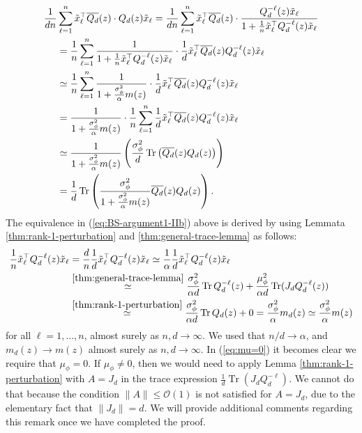 \documentclass{article}
\begin{document}
 \begin{align}
\frac{1}{dn}&\sum_{\ell=1}^n \tilde{x}_\ell^\top\overline{Q_{d}}(z)\cdot Q_{d}(z)\tilde{x}_\ell = \frac{1}{dn}\sum_{\ell=1}^n \tilde{x}_\ell^\top\overline{Q_{d}}(z)\cdot \frac{Q_{d}^{-\ell}(z)\tilde{x}_\ell}{1+\frac{1}{n}\tilde{x}_\ell^\top Q_{d}^{-\ell}(z)\tilde{x}_\ell} \notag
\\ &= \frac{1}{n}\sum_{\ell=1}^n\frac{1}{1+\frac{1}{n}\tilde{x}_\ell^\top Q_{d}^{-\ell}(z)\tilde{x}_\ell}\cdot\frac{1}{d}\tilde{x}_\ell^\top\overline{Q_{d}}(z)Q_{d}^{-\ell}(z)\tilde{x}_\ell \notag
\\ &\simeq \frac{1}{n}\sum_{\ell=1}^n\frac{1}{1+\frac{\sigma_\phi^2}{\alpha}m(z)}\cdot\frac{1}{d}\tilde{x}_\ell^\top\overline{Q_{d}}(z)Q_{d}^{-\ell}(z)\tilde{x}_\ell \label{eq:BS-argument1-IIb}
\\ &= \frac{1}{1+\frac{\sigma_\phi^2}{\alpha}m(z)}\cdot\frac{1}{n}\sum_{\ell=1}^n\frac{1}{d}\tilde{x}_\ell^\top\overline{Q_{d}}(z)Q_{d}^{-\ell}(z)\tilde{x}_\ell \notag
\\ &\simeq \frac{1}{1+\frac{\sigma_\phi^2}{\alpha}m(z)}\left(\frac{\sigma_\phi^2}{d}\operatorname{Tr}\left(\overline{Q_{d}}(z)Q_{d}(z)\right)\right) \label{eq:BS-argement2-IIb}
\\ &= \frac{1}{d}\operatorname{Tr}\left(\frac{\sigma_\phi^2}{1+\frac{\sigma_\phi^2}{\alpha}m(z)}\overline{Q_{d}}(z)Q_{d}(z)\right). \notag
\end{align}
The equivalence in (\ref{eq:BS-argument1-IIb}) above is derived by using Lemmata \ref{thm:rank-1-perturbation} and \ref{thm:general-trace-lemma} as follows:
\begin{align}
\frac{1}{n}\tilde{x}_\ell^\top Q_{d}^{-\ell}(z)\tilde{x}_\ell &= \frac{d}{n}\frac{1}{d}\tilde{x}_\ell^\top Q_{d}^{-\ell}(z)\tilde{x}_\ell \simeq \frac{1}{\alpha}\frac{1}{d}\tilde{x}_\ell^\top Q_{d}^{-\ell}(z)\tilde{x}_\ell \notag
\\ &\stackrel{\ref{thm:general-trace-lemma}}{\simeq} \frac{\sigma_\phi^2}{\alpha d}\operatorname{Tr}Q_{d}^{-\ell}(z) + \frac{\mu_\phi^2}{\alpha d}\operatorname{Tr}(J_{d}Q_{d}^{-\ell}(z)) \label{eq:mu=0}
\\ &\stackrel{\ref{thm:rank-1-perturbation}}{\simeq}\frac{\sigma_\phi^2}{\alpha d}\operatorname{Tr}Q_{d}(z)+0=\frac{\sigma_\phi^2}{\alpha}m_d(z) \simeq \frac{\sigma_\phi^2}{\alpha}m(z) \notag
\end{align}
for all $\ell=1,\dots,n$, almost surely as $n,d\to\infty$. We used that $n/d\to\alpha$, and $m_d(z)\to m(z)$ almost surely as $n,d\to\infty$. In (\ref{eq:mu=0}) it becomes clear we require that $\mu_\phi=0$. If $\mu_\phi\neq0$, then we would need to apply Lemma \ref{thm:rank-1-perturbation}  with $A=J_d$ in the trace expression $\frac{1}{d}\operatorname{Tr}(J_dQ_d^{-\ell})$. We cannot do that because the condition $\|A\|\leq\mathcal{O}(1)$ is not satisfied for $A=J_d$, due to the elementary fact that $\|J_d\|=d$. We will provide additional comments regarding this remark once we have completed the proof.
\end{document}
